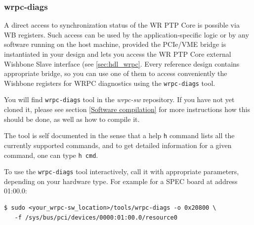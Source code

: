 \documentclass[a4paper, 12pt]{article}
\renewcommand{\_}{\underscore\allowbreak}
\begin{document}
\subsubsection{wrpc-diags}
\label{wrpc-diags}

A direct access to synchronization status of the WR PTP Core is possible via WB registers.
Such access can be used by the application-specific logic or by any software running on the
host machine, provided the PCIe/VME bridge is instantiated in your design and
lets you access the WR PTP Core external Wishbone Slave interface (see
\ref{sec:hdl_wrpc}. Every reference design contains appropriate bridge, so you
can use one of them to access conveniently the Wishbone registers for WRPC
diagnostics using the \texttt{wrpc-diags} tool.

You will find \texttt{wrpc-diags} tool in the \textit{wrpc-sw} repository. If
you have not yet cloned it, please see section \ref{Software compilation}
for more instructions how this should be done, as well as how to compile it.

The tool is self documented in the sense that a help \texttt{h} command lists
all the currently supported commands, and to get detailed information for a
given command, one can type \texttt{h cmd}.

To use the \texttt{wrpc-diags} tool interactively, call it with appropriate
parameters, depending on your hardware type. For example for a SPEC board at
address 01:00.0:
\begin{lstlisting}
$ sudo <your_wrpc-sw_location>/tools/wrpc-diags -o 0x20800 \
   -f /sys/bus/pci/devices/0000:01:00.0/resource0
\end{lstlisting}
\end{document}
